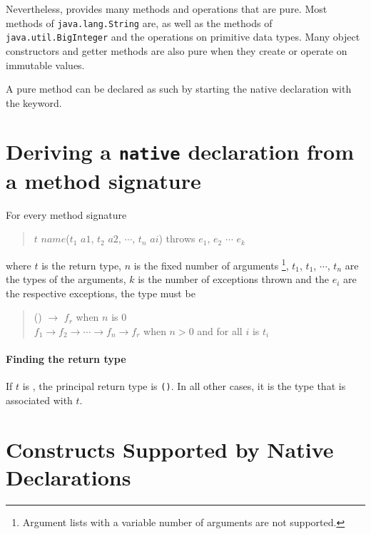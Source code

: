 Nevertheless, \java{} provides many methods and operations that are pure. Most methods of {\tt java.lang.String} are, as well as the methods of \texttt{java.util.BigInteger} and the operations on primitive data types. Many object constructors and getter methods are also pure when they create or 
operate on immutable values.

A pure \java{} method can be declared as such by starting the native declaration with the  keyword.

\section{Deriving a \frege{} \texttt{native} declaration from a \java{} method signature}

For every \java{} method signature

\begin{quote}
\begin{flushleft}
$t$ $name$($t_1$ $a1$, $t_2$ $a2$, $\cdots$, $t_n$ $ai$) throws $e_1$, $e_2$ $\cdots$ $e_k$
\end{flushleft}
\end{quote}

where $t$ is the return type, $n$ is the fixed number of arguments
\footnote{Argument lists with a variable number of arguments are not supported.},
$t_1$, $t_1$, $\cdots$, $t_n$  are the types of the arguments, 
$k$ is the number of exceptions thrown and the $e_i$ are the respective exceptions,
the \frege{} type must be

\begin{quote}
\begin{flushleft}
() $ \rightarrow{}$ $f_r$  when $n$ is 0\\
$f_1  \rightarrow{} f_2  \rightarrow{}\cdots \rightarrow{}  f_n  \rightarrow{} f_r$  when $n>0$ and for all $i$  is $t_i$\\
\end{flushleft}
\end{quote}

\paragraph{Finding the return type}

If $t$ is , the principal return type is \texttt{()}. 
In all other cases, it is the \frege{} type that is associated with $t$.


\section{\java{} Constructs Supported by Native Declarations}

